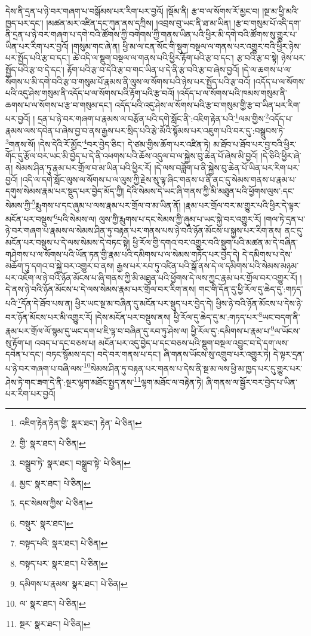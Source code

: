དེས་ནི་དྲན་པ་ཉེ་བར་གཞག་པ་བསྒོམས་པར་རིག་པར་བྱའོ། །སྡོམ་ནི། རྩ་བ་ལ་སོགས་རོ་མྱང་བ། །སྔ་མ་ཕྱི་མའི་ཁྱད་པར་དང་། །མཚན་མར་འཛིན་དང་ཀུན་ནས་དཀྲིས། །འབྲས་བུ་ཡང་ནི་ཐ་མ་ཡིན། །རྩ་བ་གསུམ་པོ་འདི་དག་ནི་དྲན་པ་ཉེ་བར་གཞག་པ་དགེ་བའི་ཚོགས་ཀྱི་བགེགས་ཀྱི་གནས་ཡིན་པའི་ཕྱིར་མི་དགེ་བའི་ཚོགས་སུ་གྱུར་པ་ཡིན་པར་རིག་པར་བྱའོ། །གསུམ་གང་ཞེ་ན། ཕྱི་མ་ལ་ངན་སོང་གི་སྡུག་བསྔལ་ལ་གནས་པར་འགྱུར་བའི་ཕྱིར་ཉེས་པར་སྤྱོད་པའི་རྩ་བ་དང་། ཚེ་འདི་ལ་སྡུག་བསྔལ་ལ་གནས་པའི་ཕྱིར་རྟོག་པའི་རྩ་བ་དང་། རྩ་བའི་རྩ་བ་སྟེ། ཉེས་པར་སྤྱོད་པའི་རྩ་བ་དེ་དང་། རྟོག་པའི་རྩ་བ་དེའི་རྩ་བ་གང་ཡིན་པ་དེ་ནི་རྩ་བའི་རྩ་བ་ཞེས་བྱའོ། །དེ་ལ་ཆགས་པ་ལ་སོགས་པ་མི་དགེ་བའི་རྩ་བ་གསུམ་པོ་རྣམས་ནི་ལུས་ལ་སོགས་པའི་ཉེས་པར་སྤྱོད་པའི་རྩ་བའོ། །འདོད་པ་ལ་སོགས་པའི་འདུ་ཤེས་གསུམ་ནི་འདོད་པ་ལ་སོགས་པའི་རྟོག་པའི་རྩ་བའོ། །འདོད་པ་ལ་སོགས་པའི་ཁམས་གསུམ་ནི་ཆགས་པ་ལ་སོགས་པ་རྩ་བ་གསུམ་དང་། འདོད་པའི་འདུ་ཤེས་ལ་སོགས་པའི་རྩ་བ་གསུམ་གྱི་རྩ་བ་ཡིན་པར་རིག་པར་བྱའོ། །
དྲན་པ་ཉེ་བར་གཞག་པ་རྣམས་ལ་བརྩོན་པའི་དགེ་སློང་ནི་:འཇིག་རྟེན་པའི་\footnote{འཇིག་རྟེན་རྟེན་གྱི་  སྣར་ཐང་། རྟེན་  པེ་ཅིན། }ལམ་གྱིས་\footnote{གྱི་  སྣར་ཐང་།  པེ་ཅིན། }འདོད་པ་རྣམས་ལས་དབེན་པ་ཞེས་བྱ་བ་ནས་རྒྱས་པར་སྲིད་པའི་རྩེ་མོའི་སྙོམས་པར་འཇུག་པའི་བར་དུ་:བསྒྲུབས་ཏེ་\footnote{བསྒྲུབ་ཏེ་  སྣར་ཐང་། བསྒྲུབ་སྟེ་  པེ་ཅིན། }གནས་སོ། །དེས་དེའི་རོ་མྱོང་\footnote{མྱང་  སྣར་ཐང་།  པེ་ཅིན། }བར་བྱེད་ཅིང་། དེ་ཙམ་གྱིས་ཆོག་པར་འཛིན་ཏེ། མ་ཐོབ་པ་ཐོབ་པར་བྱ་བའི་ཕྱིར་གོང་དུ་རྩོལ་བར་ཡང་མི་བྱེད་པ་དེ་ནི་འཕགས་པའི་ཆོས་འདུལ་བ་ལ་སྐྱེས་བུ་ཆེན་པོ་ཞེས་མི་བྱའོ། །དེ་ཅིའི་ཕྱིར་ཞེ་ན། སེམས་ཤིན་ཏུ་རྣམ་པར་གྲོལ་བ་མ་ཡིན་པའི་ཕྱིར་རོ། །དེ་ལས་བཟློག་པ་ནི་སྐྱེས་བུ་ཆེན་པོ་ཡིན་པར་རིག་པར་བྱའོ། །འདི་ལ་དགེ་སློང་ལུས་ལ་སོགས་པ་ལ་ལུས་ཀྱི་རྗེས་སུ་ལྟ་ཞིང་གནས་པ་ནི་ནང་དུ་སེམས་གནས་པ་རྣམ་པ་དགུས་སེམས་རྣམ་པར་སྡུད་པར་བྱེད་མོད་ཀྱི། དེའི་སེམས་དེ་ཡང་ཞི་གནས་ཀྱི་མི་མཐུན་པའི་ཕྱོགས་ལུས་:དང་སེམས་ཀྱི་\footnote{དང་སེམས་ཀྱིས་  པེ་ཅིན། }རྨུགས་པ་དང་ཞུམ་པ་ལས་རྣམ་པར་གྲོལ་བ་མ་ཡིན་ནོ། །རྣམ་པར་གྲོལ་བར་མ་གྱུར་པའི་ཕྱིར་དེ་ལྟར་མངོན་པར་བསྡུས་\footnote{བསྡུར་  སྣར་ཐང་། }པའི་སེམས་ལ། ལུས་ཀྱི་རྨུགས་པ་དང་སེམས་ཀྱི་ཞུམ་པ་ཡང་སྐྱེ་བར་འགྱུར་རོ། །གལ་ཏེ་དྲན་པ་ཉེ་བར་གཞག་པ་རྣམས་ལ་སེམས་ཤིན་ཏུ་བརྟན་པར་གནས་པས་ཉེ་བའི་ཉོན་མོངས་པ་སྐྱས་པར་རིག་ནས། ནང་དུ་མངོན་པར་བསྡུས་པ་དེ་ལས་སེམས་དེ་བཏང་སྟེ། ཕྱི་རོལ་གྱི་དགའ་བར་འགྱུར་བའི་སྡུག་པའི་མཚན་མ་དེ་བཞིན་གཤེགས་པ་ལ་སོགས་པའི་ཡོན་ཏན་གྱི་རྣམ་པའི་དམིགས་པ་ལ་སེམས་གཏོད་པར་བྱེད་དེ། དེ་དམིགས་པ་དེས་མཆོག་ཏུ་དགའ་བ་སྐྱེ་བར་འགྱུར་བ་ནས། རྒྱས་པར་རབ་ཏུ་འཛིན་པའི་སྒོ་ནས་དེ་ལ་དམིགས་པའི་སེམས་མཉམ་པར་འཇོག་ལ་ཉེ་བའི་ཉོན་མོངས་པ་ཞི་གནས་ཀྱི་མི་མཐུན་པའི་ཕྱོགས་དེ་ལས་ཀྱང་རྣམ་པར་གྲོལ་བར་འགྱུར་རོ། །དེ་ནས་ཉེ་བའི་ཉོན་མོངས་པ་དེ་ལས་སེམས་རྣམ་པར་གྲོལ་བར་རིག་ནས། གང་གི་དོན་དུ་ཕྱི་རོལ་དུ་ཆེད་དུ་:གཏད་པའི་\footnote{བསྟད་པའི་  སྣར་ཐང་།  པེ་ཅིན། }དོན་དེ་ཐོབ་པས་ན། ཕྱིར་ཡང་སྔ་མ་བཞིན་དུ་མངོན་པར་སྡུད་པར་བྱེད་དེ། ཕྱིས་ཉེ་བའི་ཉོན་མོངས་པ་དེས་ཉེ་བར་ཉོན་མོངས་པར་མི་འགྱུར་རོ། །དེས་མངོན་པར་བསྡུས་ནས། ཕྱི་རོལ་དུ་ཆེད་དུ་མ་:གཏད་པར་\footnote{བསྟད་པར་  སྣར་ཐང་།  པེ་ཅིན། }ཡང་བདག་ནི་རྣམ་པར་གྲོལ་ལོ་སྙམ་དུ་ཡང་དག་པ་ཇི་ལྟ་བ་བཞིན་དུ་རབ་ཏུ་ཤེས་ལ། ཕྱི་རོལ་དུ་:དམིགས་པ་རྣམ་པ་\footnote{དམིགས་པ་རྣམས་  སྣར་ཐང་།  པེ་ཅིན། }ལ་ཡོངས་སུ་རྟོག་པ། འབད་པ་དང་བཅས་པ། མངོན་པར་འདུ་བྱེད་པ་དང་བཅས་པའི་སྡུག་བསྔལ་འབྱུང་བ་དེ་དག་ལས་དབེན་པ་དང་། བཏང་སྙོམས་དང་། བདེ་བར་གནས་པ་དང་། ཞི་གནས་ཡོངས་སུ་འགྲུབ་པར་འགྱུར་ཏེ། དེ་ལྟར་དྲན་པ་ཉེ་བར་གཞག་པ་བཞི་ལས་\footnote{ལ་  སྣར་ཐང་།  པེ་ཅིན། }སེམས་ཤིན་ཏུ་བརྟན་པར་གནས་པ་དེས་ནི་སྔ་མ་ལས་ཕྱི་མ་ཁྱད་པར་དུ་གྱུར་པར་ཤེས་ཏེ་གང་ཟག་དེ་ནི་:སྔར་ལྷག་མཐོང་སྤྱད་ནས་\footnote{སྔར་  སྣར་ཐང་།  པེ་ཅིན། }ལྷག་མཐོང་ལ་བརྟེན་ཏེ། ཞི་གནས་ལ་སྦྱོར་བར་བྱེད་པ་ཡིན་པར་རིག་པར་བྱའོ། 